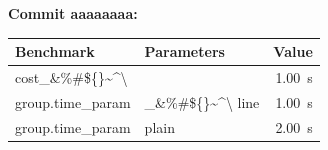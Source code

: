 
\noindent
\textbf{Commit aaaaaaaa:}

\begin{tabular}{llr}
\toprule
Benchmark & Parameters & Value \\
\midrule
cost\_\&\%\#\$\{\}\textasciitilde{}\textasciicircum{}\textbackslash{} &  & \qty{1.00}{\second} \\
group.time\_param & \_\&\%\#\$\{\}\textasciitilde{}\textasciicircum{}\textbackslash{} line & \qty{1.00}{\second} \\
group.time\_param & plain & \qty{2.00}{\second} \\
\bottomrule
\end{tabular}
